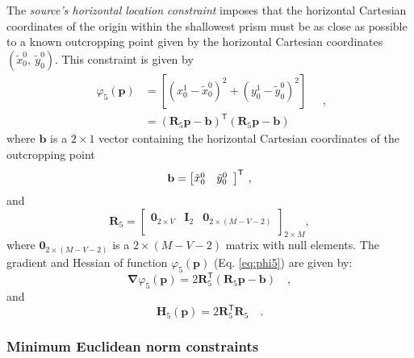The \textit{source's horizontal location constraint} imposes that the horizontal Cartesian coordinates of the origin within 
the shallowest prism must be as close as possible to a known outcropping point given by the horizontal Cartesian coordinates $(\tilde{x}_{0}^{0}, \: \tilde{y}_{0}^{0})$. 
This constraint is given by
\begin{equation}\label{eq:phi5}
\begin{split}
\varphi_{5}(\mathbf{p}) &= \left[\left(x_{0}^{1} - \tilde{x}_{0}^{0}\right)^2 
+ \left(y_{0}^{1} - \tilde{y}_{0}^{0}\right)^2\right] \\
&= \left(\mathbf{R}_{5} \mathbf{p} - \mathbf{b} \right)^{\mathsf{T}}
\left(\mathbf{R}_{5} \mathbf{p} - \mathbf{b}\right)
\end{split} \quad ,
\end{equation}
where $\mathbf{b}$ is a $2 \times 1$ vector containing the horizontal Cartesian coordinates of the outcropping point 
\begin{equation}
\mathbf{b} = \left[ \begin{array}{@{}*{12}{c}@{}}
\tilde{x}_{0}^{0} & \tilde{y}_{0}^{0} \\
\end{array} \right]^{\mathsf{T}} \: ,
\label{eq:b-vector}
\end{equation}
and
\begin{equation}
\mathbf{R}_{5} = 
\begin{bmatrix}
\mathbf{0}_{2 \times V} & \mathbf{I}_{2} & \mathbf{0}_{2 \times (M-V-2)} \\
\end{bmatrix}_{2 \times M},
\label{eq:R5-matrix}
\end{equation}
where $\mathbf{0}_{2 \times (M-V-2)}$ is a $2 \times (M-V-2)$ matrix 
with null elements. 
The gradient and Hessian of function $\varphi_{5}(\mathbf{p})$ (Eq. \ref{eq:phi5}) are given by:
\begin{equation}\label{eq:phi5_grad}
\boldsymbol{\nabla}\varphi_{5}(\mathbf{p}) = 2\mathbf{R}_{5}^{\mathsf{T}}
\left(\mathbf{R}_{5} \mathbf{p} - \mathbf{b}\right) \quad ,
\end{equation}
and
\begin{equation}\label{eq:phi5_hessian}
\mathbf{H}_{5}(\mathbf{p}) = 2 \mathbf{R}^{\mathsf{T}}_{5}\mathbf{R}_{5} \quad .
\end{equation}

\subsubsection{Minimum Euclidean norm constraints}

